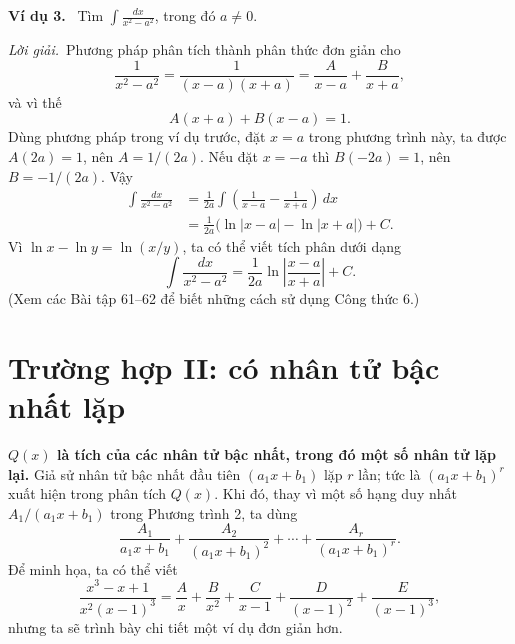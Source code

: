 \documentclass[12pt,a4paper]{article}
\newcommand{\ex}[1]{\par\medskip\noindent\textbf{Ví dụ #1.}\ }
\newcommand{\sol}{\par\nopagebreak[4]\noindent\textit{Lời giải.}\ }
\begin{document}
\ex{3} Tìm $\displaystyle\int\frac{dx}{x^2-a^2}$, trong đó $a\ne0$.
\sol Phương pháp phân tích thành phân thức đơn giản cho
\[\frac1{x^2-a^2}=\frac1{(x-a)(x+a)}=\frac A{x-a}+\frac B{x+a},\]
và vì thế
\[A(x+a)+B(x-a)=1.\]
Dùng phương pháp trong ví dụ trước, đặt $x=a$ trong phương trình này, ta được $A(2a)=1$, nên $A=1/(2a)$. Nếu đặt $x=-a$ thì $B(-2a)=1$, nên $B=-1/(2a)$. Vậy
\begin{align*}
\int\frac{dx}{x^2-a^2}&=\frac1{2a}\int\left(\frac1{x-a}-\frac1{x+a}\right)\,dx\\
&=\frac1{2a}\big(\ln|x-a|-\ln|x+a|\big)+C.
\end{align*}
Vì $\ln x-\ln y=\ln(x/y)$, ta có thể viết tích phân dưới dạng
\begin{equation}\int\frac{dx}{x^2-a^2}=\frac1{2a}\ln\left|\frac{x-a}{x+a}\right|+C.\tag{6}\end{equation}
(Xem các Bài tập 61–62 để biết những cách sử dụng Công thức 6.)

\section*{Trường hợp II: có nhân tử bậc nhất lặp}
\textbf{$Q(x)$ là tích của các nhân tử bậc nhất, trong đó một số nhân tử lặp lại.} Giả sử nhân tử bậc nhất đầu tiên $(a_1x+b_1)$ lặp $r$ lần; tức là $(a_1x+b_1)^r$ xuất hiện trong phân tích $Q(x)$. Khi đó, thay vì một số hạng duy nhất $A_1/(a_1x+b_1)$ trong Phương trình 2, ta dùng
\begin{equation}\frac{A_1}{a_1x+b_1}+\frac{A_2}{(a_1x+b_1)^2}+\cdots+\frac{A_r}{(a_1x+b_1)^r}.\tag{7}\end{equation}
Để minh họa, ta có thể viết
\[\frac{x^3-x+1}{x^2(x-1)^3}=\frac Ax+\frac B{x^2}+\frac C{x-1}+\frac D{(x-1)^2}+\frac E{(x-1)^3},\]
nhưng ta sẽ trình bày chi tiết một ví dụ đơn giản hơn.
\end{document}
